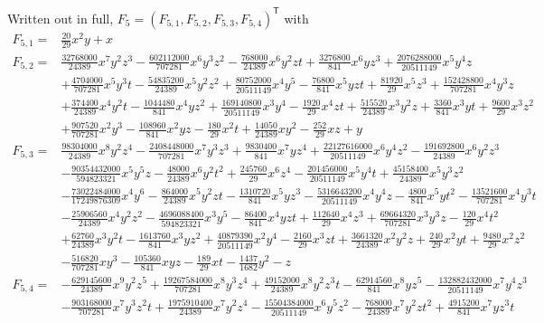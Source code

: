 \documentclass[11pt]{article}
\numberwithin{equation}{section}
\theoremstyle{plain}
\theoremstyle{definition}
\theoremstyle{remark}
\begin{document}
Written out in full,
$F_5=(F_{5,1},F_{5,2},F_{5,3},F_{5,4})^{\mathsf T}$ with
{\small
\begin{align*}
F_{5,1} ={}& \tfrac{20}{29}x^2y+x\\[2pt]
F_{5,2} ={}& \tfrac{32768000}{24389}x^7y^2z^3-\tfrac{602112000}{707281}x^6y^3z^2-\tfrac{768000}{24389}x^6y^2zt+\tfrac{3276800}{841}x^6yz^3+\tfrac{2076288000}{20511149}x^5y^4z\\
&+\tfrac{4704000}{707281}x^5y^3t-\tfrac{54835200}{24389}x^5y^2z^2+\tfrac{80752000}{20511149}x^4y^5-\tfrac{76800}{841}x^5yzt+\tfrac{81920}{29}x^5z^3+\tfrac{152428800}{707281}x^4y^3z\\
&+\tfrac{374400}{24389}x^4y^2t-\tfrac{1044480}{841}x^4yz^2+\tfrac{169140800}{20511149}x^3y^4-\tfrac{1920}{29}x^4zt+\tfrac{515520}{24389}x^3y^2z+\tfrac{3360}{841}x^3yt+\tfrac{9600}{29}x^3z^2\\
&+\tfrac{907520}{707281}x^2y^3-\tfrac{108960}{841}x^2yz-\tfrac{180}{29}x^2t+\tfrac{14050}{24389}xy^2-\tfrac{252}{29}xz+y\\[2pt]
F_{5,3} ={}& \tfrac{98304000}{24389}x^8y^2z^4-\tfrac{2408448000}{707281}x^7y^3z^3+\tfrac{9830400}{841}x^7yz^4+\tfrac{22127616000}{20511149}x^6y^4z^2-\tfrac{191692800}{24389}x^6y^2z^3\\
&-\tfrac{90354432000}{594823321}x^5y^5z-\tfrac{48000}{24389}x^6y^2t^2+\tfrac{245760}{29}x^6z^4-\tfrac{201456000}{20511149}x^5y^4t+\tfrac{45158400}{24389}x^5y^3z^2\\
&-\tfrac{73022484000}{17249876309}x^4y^6-\tfrac{864000}{24389}x^5y^2zt-\tfrac{1310720}{841}x^5yz^3-\tfrac{5316643200}{20511149}x^4y^4z-\tfrac{4800}{841}x^5yt^2-\tfrac{13521600}{707281}x^4y^3t\\
&-\tfrac{25906560}{24389}x^4y^2z^2-\tfrac{4696088400}{594823321}x^3y^5-\tfrac{86400}{841}x^4yzt+\tfrac{112640}{29}x^4z^3+\tfrac{69664320}{707281}x^3y^3z-\tfrac{120}{29}x^4t^2\\
&+\tfrac{62760}{24389}x^3y^2t-\tfrac{1613760}{841}x^3yz^2+\tfrac{40879390}{20511149}x^2y^4-\tfrac{2160}{29}x^3zt+\tfrac{3661320}{24389}x^2y^2z+\tfrac{240}{29}x^2yt+\tfrac{9480}{29}x^2z^2\\
&-\tfrac{516820}{707281}xy^3-\tfrac{105360}{841}xyz-\tfrac{189}{29}xt-\tfrac{1437}{1682}y^2-z\\[2pt]
F_{5,4} ={}& -\tfrac{629145600}{24389}x^9y^2z^5+\tfrac{19267584000}{707281}x^8y^3z^4+\tfrac{49152000}{24389}x^8y^2z^3t-\tfrac{62914560}{841}x^8yz^5-\tfrac{132882432000}{20511149}x^7y^4z^3\\
&-\tfrac{903168000}{707281}x^7y^3z^2t+\tfrac{1975910400}{24389}x^7y^2z^4-\tfrac{15504384000}{20511149}x^6y^5z^2-\tfrac{768000}{24389}x^7y^2zt^2+\tfrac{4915200}{841}x^7yz^3t\\

\end{align*}}
\end{document}
